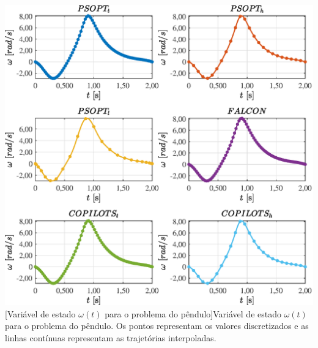 \noindent
\begin{minipage}{\textwidth}
	\vspace{\onelineskip}
	\centering
	\includegraphics[scale=0.7]{fig/resultados/penduloInvertido/traj/x/omega}
	[Variável de estado $\omega(t)$ para o problema do pêndulo]{Variável de estado $\omega(t)$ para o problema do pêndulo. Os pontos representam os valores discretizados e as linhas contínuas representam as trajetórias interpoladas.}
	\label{fig:penduloInvertido:x:omega}
	\vspace{\onelineskip}
\end{minipage}


